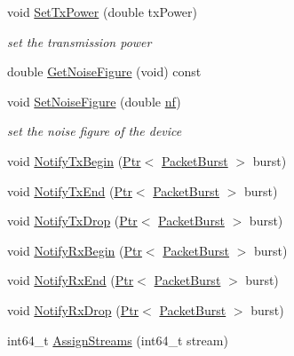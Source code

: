 \begin{DoxyCompactItemize}
\item 
void \hyperlink{classns3_1_1SimpleOfdmWimaxPhy_a7bfbb97865ba8c807191e3650b06f244}{Set\+Tx\+Power} (double tx\+Power)
\begin{DoxyCompactList}\small\item\em set the transmission power \end{DoxyCompactList}\item 
double \hyperlink{classns3_1_1SimpleOfdmWimaxPhy_a713b5f8355ab5fe168b20dfc9d33b944}{Get\+Noise\+Figure} (void) const 
\item 
void \hyperlink{classns3_1_1SimpleOfdmWimaxPhy_a426cbb568da87f5fa7f65551df9da56c}{Set\+Noise\+Figure} (double \hyperlink{lte__link__budget__x2__handover__measures_8m_a9cd8534b44434622d5c8bbb1e3f3ff62}{nf})
\begin{DoxyCompactList}\small\item\em set the noise figure of the device \end{DoxyCompactList}\item 
void \hyperlink{classns3_1_1SimpleOfdmWimaxPhy_adc0bb348b0076770a59e5cb48252df24}{Notify\+Tx\+Begin} (\hyperlink{classns3_1_1Ptr}{Ptr}$<$ \hyperlink{classns3_1_1PacketBurst}{Packet\+Burst} $>$ burst)
\item 
void \hyperlink{classns3_1_1SimpleOfdmWimaxPhy_a642edb1cdabed3021154fcc7d0f9fa5a}{Notify\+Tx\+End} (\hyperlink{classns3_1_1Ptr}{Ptr}$<$ \hyperlink{classns3_1_1PacketBurst}{Packet\+Burst} $>$ burst)
\item 
void \hyperlink{classns3_1_1SimpleOfdmWimaxPhy_ad1b6db05463189b4fb503cf342dd0499}{Notify\+Tx\+Drop} (\hyperlink{classns3_1_1Ptr}{Ptr}$<$ \hyperlink{classns3_1_1PacketBurst}{Packet\+Burst} $>$ burst)
\item 
void \hyperlink{classns3_1_1SimpleOfdmWimaxPhy_a011141b87f622186ac5bde357298a81a}{Notify\+Rx\+Begin} (\hyperlink{classns3_1_1Ptr}{Ptr}$<$ \hyperlink{classns3_1_1PacketBurst}{Packet\+Burst} $>$ burst)
\item 
void \hyperlink{classns3_1_1SimpleOfdmWimaxPhy_a0788de9218dda54087cbec6977d6d3eb}{Notify\+Rx\+End} (\hyperlink{classns3_1_1Ptr}{Ptr}$<$ \hyperlink{classns3_1_1PacketBurst}{Packet\+Burst} $>$ burst)
\item 
void \hyperlink{classns3_1_1SimpleOfdmWimaxPhy_a529e1a876bf8a7edaa0d9137b0f0a997}{Notify\+Rx\+Drop} (\hyperlink{classns3_1_1Ptr}{Ptr}$<$ \hyperlink{classns3_1_1PacketBurst}{Packet\+Burst} $>$ burst)
\item 
int64\+\_\+t \hyperlink{classns3_1_1SimpleOfdmWimaxPhy_a63c99fca7ac5fd0649b845672c3496b5}{Assign\+Streams} (int64\+\_\+t stream)
\end{DoxyCompactItemize}
